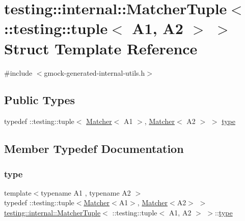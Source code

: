 \hypertarget{structtesting_1_1internal_1_1MatcherTuple_3_01_1_1testing_1_1tuple_3_01A1_00_01A2_01_4_01_4}{}\section{testing\+::internal\+::Matcher\+Tuple$<$ \+::testing\+::tuple$<$ A1, A2 $>$ $>$ Struct Template Reference}
\label{structtesting_1_1internal_1_1MatcherTuple_3_01_1_1testing_1_1tuple_3_01A1_00_01A2_01_4_01_4}


{\ttfamily \#include $<$gmock-\/generated-\/internal-\/utils.\+h$>$}

\subsection*{Public Types}
\begin{DoxyCompactItemize}
\item 
typedef \+::testing\+::tuple$<$ \mbox{\hyperlink{classtesting_1_1Matcher}{Matcher}}$<$ A1 $>$, \mbox{\hyperlink{classtesting_1_1Matcher}{Matcher}}$<$ A2 $>$ $>$ \mbox{\hyperlink{structtesting_1_1internal_1_1MatcherTuple_3_01_1_1testing_1_1tuple_3_01A1_00_01A2_01_4_01_4_a0ba88406203fde086f85abbf68ce2924}{type}}
\end{DoxyCompactItemize}


\subsection{Member Typedef Documentation}
\mbox{\label{structtesting_1_1internal_1_1MatcherTuple_3_01_1_1testing_1_1tuple_3_01A1_00_01A2_01_4_01_4_a0ba88406203fde086f85abbf68ce2924}} 
\subsubsection{\texorpdfstring{type}{type}}
{\footnotesize\ttfamily template$<$typename A1 , typename A2 $>$ \\
typedef \+::testing\+::tuple$<$\mbox{\hyperlink{classtesting_1_1Matcher}{Matcher}}$<$A1$>$, \mbox{\hyperlink{classtesting_1_1Matcher}{Matcher}}$<$A2$>$ $>$ \mbox{\hyperlink{structtesting_1_1internal_1_1MatcherTuple}{testing\+::internal\+::\+Matcher\+Tuple}}$<$ \+::testing\+::tuple$<$ A1, A2 $>$ $>$\+::\mbox{\hyperlink{structtesting_1_1internal_1_1MatcherTuple_3_01_1_1testing_1_1tuple_3_01A1_00_01A2_01_4_01_4_a0ba88406203fde086f85abbf68ce2924}{type}}}



